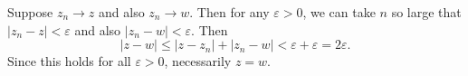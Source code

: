 Suppose $z_n \to z$ and also $z_n \to w$. Then for any $\varepsilon > 0$, we can take $n$ so large that $|z_n - z| < \varepsilon$ and also $|z_n - w| < \varepsilon$. Then
$$|z - w| \leq |z - z_n| + |z_n - w| < \varepsilon + \varepsilon = 2\varepsilon.$$
Since this holds for all $\varepsilon > 0$, necessarily $z = w$.
